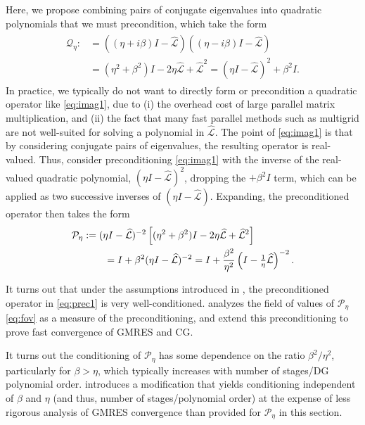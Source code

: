 \documentclass[review]{siamart}
\begin{document}
Here, we propose combining pairs of conjugate eigenvalues into quadratic polynomials
that we must precondition, which take the form
%
\begin{align}\label{eq:imag1}
\begin{split}
\mathcal{Q}_\eta :&= ((\eta + i\beta)I - \widehat{\mathcal{L}})((\eta - i\beta)I - \widehat{\mathcal{L}}) \\
& = (\eta^2+\beta^2)I - 2\eta \widehat{\mathcal{L}} + \widehat{\mathcal{L}}^2
= (\eta I - \widehat{\mathcal{L}})^2 + \beta^2I.
\end{split}
\end{align}
%
In practice, we typically do not want to directly form or precondition a quadratic
operator like \eqref{eq:imag1}, due to (i) the overhead cost of large parallel matrix
multiplication, and (ii) the fact that many fast parallel methods such as multigrid are not well-suited for solving a polynomial in $\widehat{\mathcal{L}}$. The point of \eqref{eq:imag1}
is that by considering conjugate pairs of eigenvalues, the resulting operator is real-valued.
Thus, consider preconditioning \eqref{eq:imag1} with the inverse of the real-valued quadratic
polynomial, $(\eta I - \widehat{\mathcal{L}})^2$, dropping the $+ \beta^2 I$ term, which can
be applied as two successive inverses of $(\eta I - \widehat{\mathcal{L}})$. Expanding,
the preconditioned operator then takes the form
%
\begin{align}\nonumber
\mathcal{P}_\eta & := (\eta I - \widehat{\mathcal{L}})^{-2}\left[(\eta^2+\beta^2)I - 2\eta \widehat{\mathcal{L}} + \widehat{\mathcal{L}}^2\right] \\
&\hspace{5ex} = I + \beta^2(\eta I - \widehat{\mathcal{L}})^{-2}
= I + \frac{\beta^2}{\eta^2}\left(I - \tfrac{1}{\eta}\widehat{\mathcal{L}}\right)^{-2}.\label{eq:prec1}
\end{align}
%

It turns out that under the assumptions introduced in , the preconditioned
operator in \eqref{eq:prec1} is very well-conditioned.  analyzes the
field of values of $\mathcal{P}_\eta$ \eqref{eq:fov}
as a measure of the preconditioning, and  extend this
preconditioning to prove fast convergence of GMRES and CG.

%
\begin{remark}
\textnormal{ }\newline
It turns out the conditioning of $\mathcal{P}_\eta$ has some dependence on the ratio
$\beta^2/\eta^2$, particularly for $\beta > \eta$, which typically increases
with number of stages/DG polynomial order.  introduces
a modification that yields conditioning independent of $\beta$ and $\eta$
(and thus, number of stages/polynomial order) at the expense of less rigorous
analysis of GMRES convergence than provided for $\mathcal{P}_\eta$ in this section.
\end{remark}
%
\end{document}
